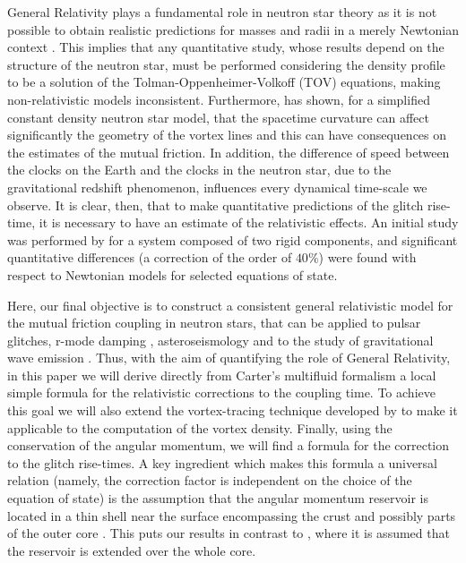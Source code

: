 \documentclass[usenatbib%
]{mnras}
\begin{document}
General Relativity plays a fundamental role in neutron star theory as it is not possible to obtain realistic predictions for masses and radii in a merely Newtonian context \citep{shapiroteukolsky}. 
This implies that any quantitative study, whose results depend on the structure of the neutron star, must be performed considering the density profile to be a solution of the Tolman-Oppenheimer-Volkoff (TOV) equations, making non-relativistic models  inconsistent. Furthermore, \cite{Rothen1981} has shown, for a simplified constant density neutron star model, that the spacetime curvature can affect significantly the geometry of the vortex lines and this can have consequences on the estimates of the mutual friction. In addition, the difference of speed between the clocks on the Earth and the clocks in the neutron star, due to the gravitational redshift phenomenon, influences every dynamical time-scale we observe. 
It is clear, then, that to make quantitative predictions of the glitch rise-time, it is necessary to have an estimate of the relativistic effects. An initial study was performed by \cite{sourie_glitch2017} for a system composed of two rigid components, and significant quantitative differences (a correction of the order of $40 \%$) were found with respect to Newtonian models for selected equations of state.

Here, our final objective is to construct a consistent general relativistic model for the mutual friction coupling in neutron stars, that can be applied to pulsar glitches, r-mode damping \citep{Haskell2015R-modes}, asteroseismology and to the study of gravitational wave emission \citep{Glampedakis2018survey}. 
Thus, with the aim of quantifying the role of General Relativity, in this paper we will derive directly from Carter's multifluid formalism a local simple formula for the relativistic corrections to the coupling time. To achieve this goal we will also extend the vortex-tracing technique developed by \cite{Rothen1981} to make it applicable to the computation of the vortex density. Finally, using the conservation of the angular momentum, we will find a formula for the correction to the glitch rise-times.   
A key ingredient which makes this formula a universal relation (namely, the correction factor is independent on the choice of the equation of state) is the assumption that the angular momentum reservoir is located in a thin shell near the surface encompassing the crust and possibly parts of the outer core \citep{Ho_2015}. 
This puts our results in contrast to \cite{sourie_glitch2017}, where it is assumed that the reservoir is extended over the whole core. 
\end{document}
